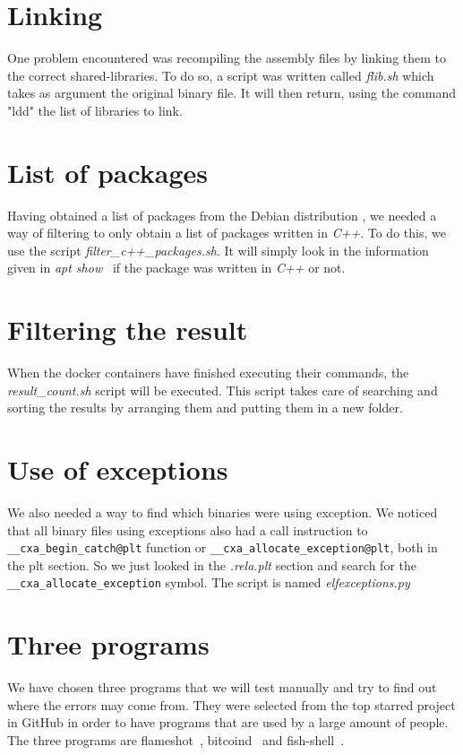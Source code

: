 \documentclass[a4paper,11pt,oneside]{report}
\begin{document}
\section{Linking}
One problem encountered was recompiling the
assembly files by linking them to the correct shared-libraries. To do so, a 
script was written called  \textit{flib.sh} which takes as argument the original binary
file. It will then return, using the command "ldd"\cite{ldd} the list of
libraries to link. 

\section{List of packages}

Having obtained a list of packages from the Debian distribution
\cite{sourcePackage}, we needed a way of filtering to only obtain
a list of packages written in \textit{C++}. To do this, we use the script
\textit{filter\_c++\_packages.sh}. It will simply look in the information given
in \textit{apt show}~\cite{apt} if the package was written in \textit{C++} or
not. 

\section{Filtering the result}
When the docker containers have finished executing their commands, the
\textit{result\_count.sh} script will be executed. This script takes care of searching
and sorting the results by arranging them and putting them in a new folder.

\section{Use of exceptions}
We also needed a way to find which binaries were using exception. We noticed
that all binary files using exceptions also had a call instruction to
\verb|__cxa_begin_catch@plt| function or
\verb|__cxa_allocate_exception@plt|, both in the plt section.
So we just looked in the \textit{.rela.plt} section and search for the
\verb|__cxa_allocate_exception| symbol. The script is named \textit{elfexceptions.py}


\section{Three programs}
We have chosen three programs that we will test manually and try to find out
where the errors may come from. They were selected from the top starred project
in GitHub in order to have programs that are used by a large amount of people.
The three programs are flameshot~\cite{flameshot}, bitcoind~\cite{bitcoind} and
fish-shell~\cite{fish}.
\end{document}
